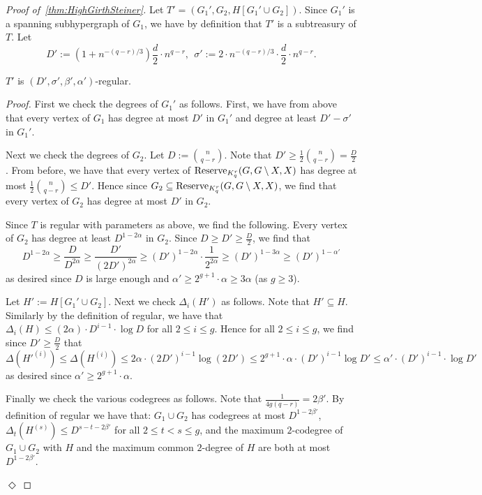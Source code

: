 \documentclass[11pt]{article}
\newcounter{i}
\theoremstyle{plain}
\newenvironment{proofclaim}[1][]%
{\noindent \emph{Proof.} {}{#1}{}}{\hfill
	$\Diamond$\vspace{1em}}
\renewcommand{\theclaim}{\thetheorem.\arabic{claim}}
\newenvironment{lateproof}[1]
 {%
  \renewcommand{\theclaim}{\ref{#1}.\arabic{claim}}%
  \begin{proof}[Proof of~\cref{#1}]%
 }
 {\end{proof}}
\theoremstyle{plain} %
\theoremstyle{definition}
\begin{document}
\begin{lateproof}{thm:HighGirthSteiner}
Let $T'=(G_1',G_2, H[G_1'\cup G_2])$. Since $G_1'$ is a spanning subhypergraph of $G_1$, we have by definition that $T'$ is a subtreasury of $T$. Let
$$D':=\left(1+n^{-(q-r)/3}\right)\frac{d}{2}\cdot n^{q-r},~~\sigma' := 2\cdot n^{-(q-r)/3} \cdot \frac{d}{2} \cdot n^{q-r}.$$

\begin{claim}
$T'$ is $(D',\sigma',\beta',\alpha')$-regular. 
\end{claim}
\begin{proofclaim}
First we check the degrees of $G_1'$ as follows. First, we have from above that every vertex of $G_1$ has degree at most $D'$ in $G_1'$ and degree at least $D'-\sigma'$ in $G_1'$. 

Next we check the degrees of $G_2$. Let $D:= \binom{n}{q-r}$. Note that $D' \ge \frac{1}{2} \binom{n}{q-r}=\frac{D}{2}$. From before, we have that every vertex of ${\rm Reserve}_{K_q^r}(G,G\setminus X, X)$ has degree at most $\frac{1}{2} \binom{n}{q-r} \le D'$. Hence since $G_2\subseteq {\rm Reserve}_{K_q^r}(G,G\setminus X, X)$, we find that every vertex of $G_2$ has degree at most $D'$ in $G_2$.  

Since $T$ is regular with parameters as above, we find the following. Every vertex of $G_2$ has degree at least $D^{1-2\alpha}$ in $G_2$. Since $D\ge D'\ge \frac{D}{2}$, we find that
 $$D^{1-2\alpha} \ge \frac{D}{D^{2\alpha}} \ge \frac{D'}{(2D')^{2\alpha}} \ge (D')^{1-2\alpha}\cdot \frac{1}{2^{2\alpha}} \ge (D')^{1-3\alpha} \ge (D')^{1-\alpha'}$$ 
as desired since $D$ is large enough and $\alpha' \ge 2^{g+1} \cdot \alpha \ge 3\alpha$ (as $g\ge 3$).  

Let $H':= H[G_1'\cup G_2]$. Next we check $\Delta_i(H')$ as follows. Note that $H'\subseteq H$. Similarly by the definition of regular, we have that $\Delta_i(H) \le (2\alpha)\cdot D^{i-1}\cdot \log D$ for all $2\le i \le g$. Hence for all $2\le i\le g$, we find since $D' \ge \frac{D}{2}$ that
$$\Delta\left(H'^{(i)}\right) \le \Delta\left(H^{(i)}\right) \le 2\alpha \cdot (2D')^{i-1} \log (2D') \le 2^{g+1}\cdot \alpha \cdot (D')^{i-1} \log D' \le \alpha' \cdot (D')^{i-1} \cdot \log D'$$
as desired since $\alpha' \ge 2^{g+1}\cdot \alpha$.

Finally we check the various codegrees as follows. Note that $\frac{1}{4g(q-r)} = 2\beta'$. By definition of regular we have that: $G_1\cup G_2$ has codegrees at most $D^{1-2\beta'}$, $\Delta_{t}(H^{(s)}) \le D^{s-t-2\beta'}$ for all $2\le t< s\le g$, and the maximum $2$-codegree of $G_1\cup G_2$ with $H$ and the maximum common $2$-degree of $H$ are both at most $D^{1-2\beta'}$. 


\end{proofclaim}
\end{lateproof}
\end{document}

